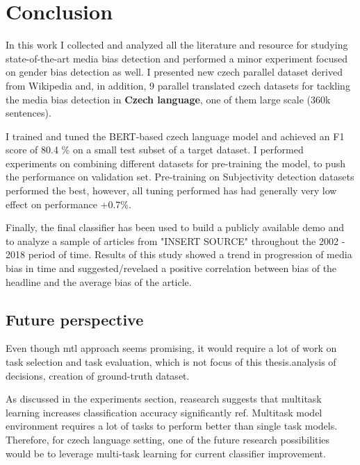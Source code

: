 \chapter{Conclusion}
In this work I collected and analyzed all the literature and resource for studying state-of-the-art media bias detection and performed a minor experiment focused on gender bias detection as well. I presented new czech parallel dataset derived from Wikipedia and, in addition, 9 parallel translated czech datasets for tackling the media bias detection in \textbf{Czech language}, one of them large scale (360k sentences).

I trained and tuned the BERT-based czech language model and achieved an F1 score of 80.4 \% on a small test subset of a target dataset. I performed experiments on combining different datasets for pre-training the model, to push the performance on validation set. Pre-training on Subjectivity detection datasets performed the best, however, all tuning performed has had generally very low effect on performance +0.7\%. 

Finally, the final classifier has been used to build a publicly available demo and to analyze a sample of articles from "INSERT SOURCE" throughout the 2002 - 2018 period of time. Results of this study showed a trend in progression of media bias in time and suggested/revelaed a positive correlation between bias of the headline and the average bias of the article.



\section{Future perspective}
Even though \Gls{mtl} approach seems promising, it would require a lot of work on task selection and task evaluation, which is not focus of this thesis.analysis of decisions, creation of ground-truth dataset. 

As discussed in the experiments section, reasearch suggests that multitask learning increases classification accuracy significantly ref. Multitask model environment requires a lot of tasks \cite{aribandi2021ext5} to perform better than single task models. Therefore, for czech language setting, one of the future research possibilities would be to leverage multi-task learning for current classifier improvement. 